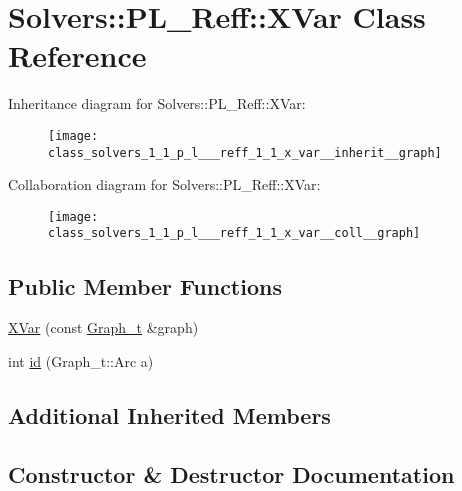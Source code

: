 \hypertarget{class_solvers_1_1_p_l___reff_1_1_x_var}{}\section{Solvers\+:\+:P\+L\+\_\+\+Reff\+:\+:X\+Var Class Reference}
\label{class_solvers_1_1_p_l___reff_1_1_x_var}


Inheritance diagram for Solvers\+:\+:P\+L\+\_\+\+Reff\+:\+:X\+Var\+:\nopagebreak
\begin{figure}[H]
\begin{center}
\leavevmode
\texttt{[image: class\_solvers\_1\_1\_p\_l\_\_\_reff\_1\_1\_x\_var\_\_inherit\_\_graph]}
\end{center}
\end{figure}


Collaboration diagram for Solvers\+:\+:P\+L\+\_\+\+Reff\+:\+:X\+Var\+:\nopagebreak
\begin{figure}[H]
\begin{center}
\leavevmode
\texttt{[image: class\_solvers\_1\_1\_p\_l\_\_\_reff\_1\_1\_x\_var\_\_coll\_\_graph]}
\end{center}
\end{figure}
\subsection*{Public Member Functions}
\begin{DoxyCompactItemize}
\item 
\hyperlink{class_solvers_1_1_p_l___reff_1_1_x_var_a69af818653ea6637c332862665450663}{X\+Var} (const \hyperlink{pl__reff_8cpp_a65aea14f39d53b24df9910d54216d620}{Graph\+\_\+t} \&graph)
\item 
int \hyperlink{class_solvers_1_1_p_l___reff_1_1_x_var_a28ce9ea0dfd74c1f04feaa90809bcd66}{id} (Graph\+\_\+t\+::\+Arc a)
\end{DoxyCompactItemize}
\subsection*{Additional Inherited Members}


\subsection{Constructor \& Destructor Documentation}
\mbox{\label{class_solvers_1_1_p_l___reff_1_1_x_var_a69af818653ea6637c332862665450663}} 
